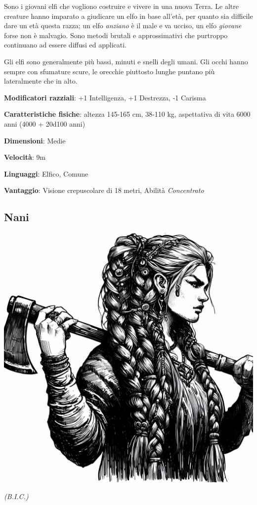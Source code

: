 \begin{multicols}{2}
Sono i giovani elfi che vogliono costruire e vivere in una nuova Terra. Le altre creature hanno imparato a giudicare un elfo in base all'età, per quanto sia difficile dare un età questa razza; un elfo \emph{anziano} è il male e va ucciso, un elfo \emph{giovane} forse non è malvagio.
Sono metodi brutali e approssimativi che purtroppo continuano ad essere diffusi ed applicati.

Gli elfi sono generalmente più bassi, minuti e snelli degli umani. Gli occhi hanno sempre con sfumature scure, le orecchie piuttosto lunghe puntano più lateralmente che in alto.


\textbf{Modificatori razziali}: +1 Intelligenza, +1 Destrezza, -1 Carisma

\textbf{Caratteristiche fisiche}: altezza 145-165 cm, 38-110 kg, aspettativa di vita 6000 anni (4000 + 20d100 anni)

\textbf{Dimensioni}: Medie

\textbf{Velocità}: 9m

\textbf{Linguaggi}: Elfico, Comune

\textbf{Vantaggio}: Visione crepuscolare di 18 metri, Abilità \emph{Concentrato}

\subsection{Nani}\label{nani}


\begin{center}
\includegraphics[height=0.7\linewidth]{immagini/nana2-ai.png}

\textit{(B.I.C.)}
\end{center}


\end{multicols}

